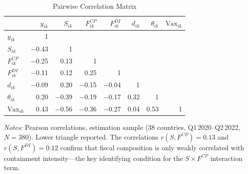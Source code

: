 \documentclass[12pt, a4paper]{article}
\begin{document}
\begin{table}[H]
\centering
\caption{Pairwise Correlation Matrix}
\label{tab:corr_matrix}
\scriptsize
\begin{tabular}{@{} l r r r r r r r @{}}
\toprule
 & $y_{ik}$ & $S_{ik}$ & $F^{CP}_{ik}$ & $F^{DI}_{ik}$
 & $d_{ik}$ & $\theta_{ik}$ & $\text{Vax}_{ik}$ \\
\midrule
$y_{ik}$           & 1    &       &       &       &       &       &  \\
$S_{ik}$           & $-$0.43 & 1  &       &       &       &       &  \\
$F^{CP}_{ik}$      & $-$0.25 & 0.13  & 1  &       &       &       &  \\
$F^{DI}_{ik}$      & $-$0.11 & 0.12  & 0.25  & 1  &       &       &  \\
$d_{ik}$           & $-$0.09 & 0.20  & $-$0.15 & $-$0.04 & 1  &       &  \\
$\theta_{ik}$      & 0.20  & $-$0.39 & $-$0.19 & $-$0.17 & 0.32  & 1  &  \\
$\text{Vax}_{ik}$  & 0.43  & $-$0.56 & $-$0.36 & $-$0.27 & 0.04  & 0.53  & 1 \\
\bottomrule
\end{tabular}
\vspace{4pt}

\parbox{\textwidth}{\scriptsize\textit{Notes:} Pearson correlations,
estimation sample (38 countries, Q1\,2020--Q2\,2022, $N = 380$).
Lower triangle reported. The correlations
$r(S, F^{CP}) = 0.13$ and $r(S, F^{DI}) = 0.12$ confirm that fiscal
composition is only weakly correlated with containment intensity---the
key identifying condition for the $S \times F^{CP}$ interaction term.}
\end{table}
\end{document}
